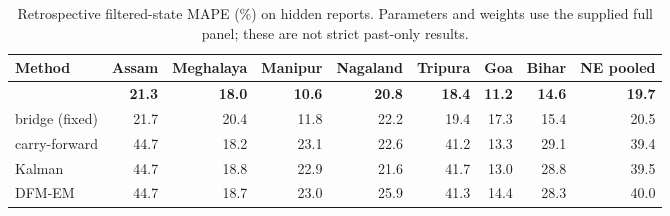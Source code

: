 \begin{table}[tbp]
\caption{Retrospective filtered-state MAPE (\%) on hidden reports. Parameters and weights use the supplied full panel; these are not strict past-only results.}
\label{tab:online}
\small
\begin{tabular}{lrrrrrrrr}
\toprule
Method & Assam & Meghalaya & Manipur & Nagaland & Tripura & Goa & Bihar & NE pooled \\
\midrule
\auto{} & \textbf{21.3} & \textbf{18.0} & \textbf{10.6} & \textbf{20.8} & \textbf{18.4} & \textbf{11.2} & \textbf{14.6} & \textbf{19.7} \\
bridge (fixed) & 21.7 & 20.4 & 11.8 & 22.2 & 19.4 & 17.3 & 15.4 & 20.5 \\
carry-forward & 44.7 & 18.2 & 23.1 & 22.6 & 41.2 & 13.3 & 29.1 & 39.4 \\
Kalman & 44.7 & 18.8 & 22.9 & 21.6 & 41.7 & 13.0 & 28.8 & 39.5 \\
DFM-EM & 44.7 & 18.7 & 23.0 & 25.9 & 41.3 & 14.4 & 28.3 & 40.0 \\
\bottomrule
\end{tabular}
\end{table}
